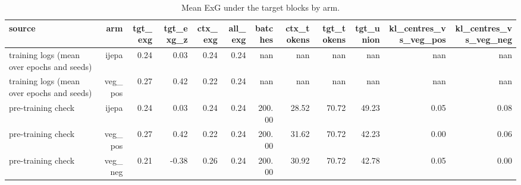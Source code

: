 \begin{table}[t]
\centering
\small
\caption{Mean ExG under the target blocks by arm.}
\label{tab:manipulation_check}
\begin{tabular}{lrrrrrrrrrrr}
\toprule
source & arm & tgt\_exg & tgt\_exg\_z & ctx\_exg & all\_exg & batches & ctx\_tokens & tgt\_tokens & tgt\_union & kl\_centres\_vs\_veg\_pos & kl\_centres\_vs\_veg\_neg \\
\midrule
training logs (mean over epochs and seeds) & ijepa & 0.24 & 0.03 & 0.24 & 0.24 & nan & nan & nan & nan & nan & nan \\
training logs (mean over epochs and seeds) & veg\_pos & 0.27 & 0.42 & 0.22 & 0.24 & nan & nan & nan & nan & nan & nan \\
pre-training check & ijepa & 0.24 & 0.03 & 0.24 & 0.24 & 200.00 & 28.52 & 70.72 & 49.23 & 0.05 & 0.08 \\
pre-training check & veg\_pos & 0.27 & 0.42 & 0.22 & 0.24 & 200.00 & 31.62 & 70.72 & 42.23 & 0.00 & 0.06 \\
pre-training check & veg\_neg & 0.21 & -0.38 & 0.26 & 0.24 & 200.00 & 30.92 & 70.72 & 42.78 & 0.05 & 0.00 \\
\bottomrule
\end{tabular}
\end{table}
